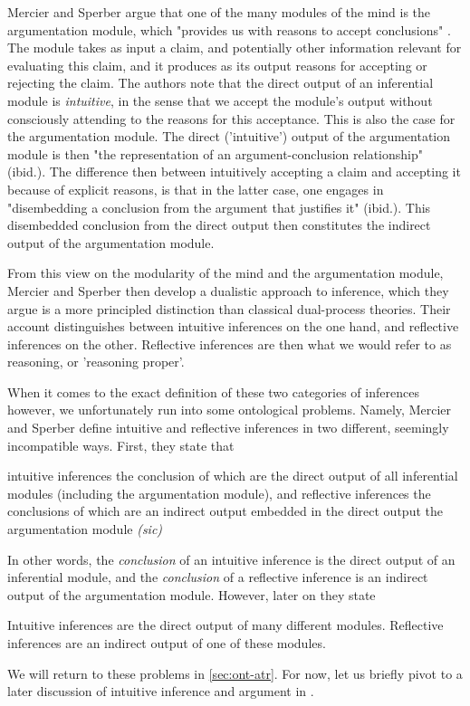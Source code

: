 Mercier and Sperber argue that one of the many modules of the mind is the argumentation module, which "provides us with reasons to accept conclusions" \citep[p.~155]{MS09}. The module takes as input a claim, and potentially other information relevant for evaluating this claim, and it produces as its output reasons for accepting or rejecting the claim.
The authors note that the direct output of an inferential module is \emph{intuitive}, in the sense that we accept the module's output without consciously attending to the reasons for this acceptance. This is also the case for the argumentation module. The direct ('intuitive') output of the argumentation module is then "the representation of an argument-conclusion relationship" (ibid.).
The difference then between intuitively accepting a claim and accepting it because of explicit reasons, is that in the latter case, one engages in "disembedding a conclusion from the argument that justifies it" (ibid.).
This disembedded conclusion from the direct output then constitutes the indirect output of the argumentation module.

From this view on the modularity of the mind and the argumentation module, Mercier and Sperber then develop a dualistic approach to inference, which they argue is a more principled distinction than classical dual-process theories.
Their account distinguishes between intuitive inferences on the one hand, and reflective inferences on the other. Reflective inferences are then what we would refer to as reasoning, or 'reasoning proper'.

When it comes to the exact definition of these two categories of inferences however, we unfortunately run into some ontological problems.
Namely, Mercier and Sperber define intuitive and reflective inferences in two different, seemingly incompatible ways. First, they state that
\begin{quoting}
    intuitive inferences the conclusion of which are the direct output of all inferential modules (including the argumentation module), and reflective inferences the conclusions of which are an indirect output embedded in the direct output the argumentation module \emph{(sic)}
    \hfill \citep[pp.~155--156]{MS09}
\end{quoting}
In other words, the \emph{conclusion} of an intuitive inference is the direct output of an inferential module, and the \emph{conclusion} of a reflective inference is an indirect output of the argumentation module. However, later on they state
\begin{quoting}
    Intuitive inferences are the direct output of many different modules. Reflective inferences are an indirect output of one of these modules.
    \hfill \citep[p.~156]{MS09}
\end{quoting}
We will return to these problems in \cref{sec:ont-atr}.
For now, let us briefly pivot to a later discussion of intuitive inference and argument in \citet[\S 1.1]{MS11}.

